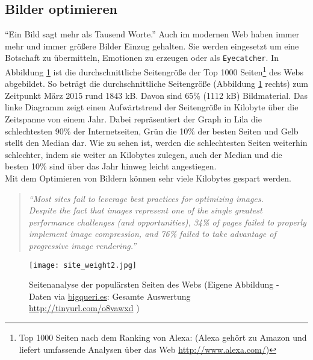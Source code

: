 \pagebreak
%
%	


	\subsection{Bilder optimieren} %
	\label{sub:bilder_optimieren}
		"`Ein Bild sagt mehr als Tausend Worte."' Auch im modernen Web haben immer mehr und immer größere Bilder Einzug gehalten. Sie werden eingesetzt um eine Botschaft zu übermitteln, Emotionen zu erzeugen oder als \texttt{Eyecatcher}. In Abbildung \ref{fig:site_weight} ist die durchschnittliche Seitengröße der Top 1000 Seiten\footnote{Top 1000 Seiten nach dem Ranking von Alexa: (Alexa gehört zu Amazon und liefert umfassende Analysen über das Web \url{http://www.alexa.com/})} des Webs abgebildet. So beträgt die durchschnittliche Seitengröße (Abbildung \ref{fig:site_weight} rechts) zum Zeitpunkt März 2015 rund 1843 kB. Davon sind 65\% (1112 kB) Bildmaterial. Das linke Diagramm zeigt einen Aufwärtstrend der Seitengröße in Kilobyte über die Zeitspanne von einem Jahr. Dabei repräsentiert der Graph in Lila die schlechtesten 90\% der Internetseiten, Grün die 10\% der besten Seiten und Gelb stellt den Median dar. Wie zu sehen ist, werden die schlechtesten Seiten weiterhin schlechter, indem sie weiter an Kilobytes zulegen, auch der Median und die besten 10\% sind über das Jahr hinweg leicht angestiegen.\\

		Mit dem Optimieren von Bildern können sehr viele Kilobytes gespart werden.

		\begin{quote}
			\textit{"`Most sites fail to leverage best practices for optimizing images.\\
			Despite the fact that images represent one of the single greatest performance challenges (and opportunities), 34\% of pages failed to properly implement image compression, and 76\% failed to take advantage of progressive image rendering."'} \autocite[p. 4]{radware14}
		\end{quote}

		\begin{figure}[htbp]
			\begin{center}
				\texttt{[image: site\_weight2.jpg]}
				\caption{Seitenanalyse der populärsten Seiten des Webs (Eigene Abbildung - Daten via \url{bigqueri.es}: Gesamte Auswertung \url{http://tinyurl.com/o8vawxd} )}
				\label{fig:site_weight}
			\end{center}
		\end{figure}

